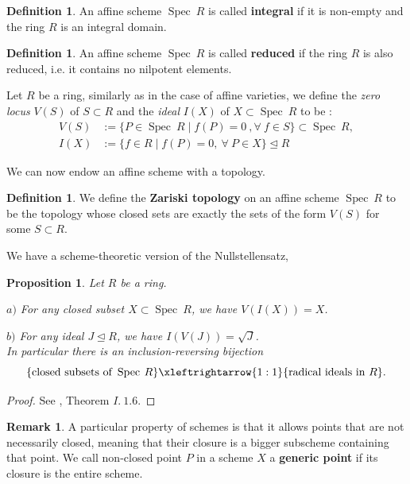 \documentclass{article}
\theoremstyle{plain}
\newtheorem{proposition}[theorem]{Proposition}
\theoremstyle{definition}
\newtheorem{definition}[theorem]{Definition}
\newtheorem{remark}{Remark}
\DeclareMathOperator{\Spec}{Spec}
\begin{document}
\begin{definition}
    An affine scheme $\Spec\: R$ is called \textbf{integral} if it is non-empty and the ring $R$ is an integral domain.
\end{definition}
\begin{definition}
    An affine scheme $\Spec\: R$ is called \textbf{reduced} if the ring $R$ is also reduced, i.e. it contains no nilpotent elements.
\end{definition}


\noindent Let $R$ be a ring, similarly as in the case of affine varieties, we define the \textit{zero locus} $V(S)$ of $S\subset R$ and the \textit{ideal} $I(X)$ of $X\subset \Spec\: R$ to be :
\begin{equation*}
\begin{split}
    V(S) &:= \{P\in\Spec\:R \mid f(P)=0\:,\forall \:f\in S\} \subset \Spec\:R, \\
    I(X) &:=\{f\in R\mid f(P)=0,\:\forall\: P\in X\} \trianglelefteq R
\end{split}
\end{equation*}

\noindent We can now endow an affine scheme with a topology.
\begin{definition}
    We define the \textbf{Zariski topology} on an affine scheme $\Spec\:R$ to be the topology whose closed sets are exactly the sets of the form $V(S)$ for some $S\subset R$.
\end{definition}
\noindent We have a scheme-theoretic version of the Nullstellensatz, 
\begin{proposition}
    Let $R$ be a ring. 
    
    $a)$ For any closed subset $X\subset \Spec\:R$, we have $V(I(X))=X$.
    
    $b)$ For any ideal $J\trianglelefteq R$, we have $I(V(J))=\sqrt{J}$.\\
    In particular there is an inclusion-reversing bijection
    \begin{equation*}
        \{\text{closed subsets of }\Spec\:R\} \xleftrightarrow{1:1} \{\text{radical ideals in } R\}.
    \end{equation*}
\end{proposition}
\begin{proof}
    See \cite{Eisenbud}, Theorem $I.\:1.6$.
\end{proof}





\begin{remark}
    A particular property of schemes is that it allows points that are not necessarily closed, meaning that their closure is a bigger subscheme containing that point.
    We call non-closed point $P$ in a scheme $X$ a \textbf{generic point} if its closure is the entire scheme.
\end{remark}
\end{document}
